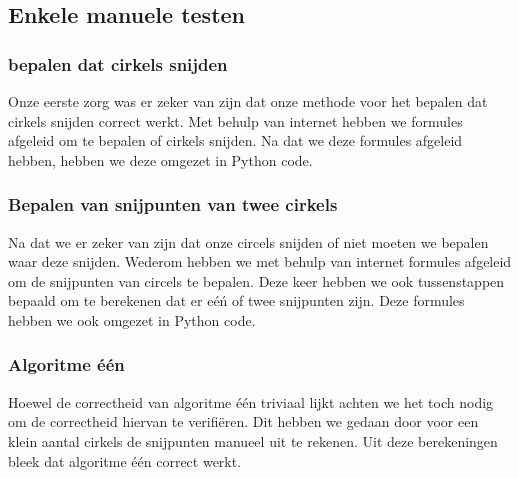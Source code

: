 \documentclass[11pt,a4paper]{article}
\begin{document}
\subsection{Enkele manuele testen}

\subsubsection*{bepalen dat cirkels snijden}
Onze eerste zorg was er zeker van zijn dat onze methode voor het bepalen dat cirkels snijden correct werkt. Met behulp van internet hebben we formules afgeleid om te bepalen of cirkels snijden. Na dat we deze formules afgeleid hebben, hebben we deze omgezet in Python code.

\subsubsection*{Bepalen van snijpunten van twee cirkels}
Na dat we er zeker van zijn dat onze circels snijden of niet moeten we bepalen waar deze snijden. Wederom hebben we met behulp van internet formules afgeleid om de snijpunten van circels te bepalen. Deze keer hebben we ook tussenstappen bepaald om te berekenen dat er e\'e\'n of twee snijpunten zijn. Deze formules hebben we ook omgezet in Python code.

\subsubsection*{Algoritme \'e\'en}
Hoewel de correctheid van algoritme \'e\'en triviaal lijkt achten we het toch nodig om de correctheid hiervan te verifi\"eren. Dit hebben we gedaan door voor een klein aantal cirkels de snijpunten manueel uit te rekenen. Uit deze berekeningen bleek dat algoritme \'e\'en correct werkt.
\end{document}
